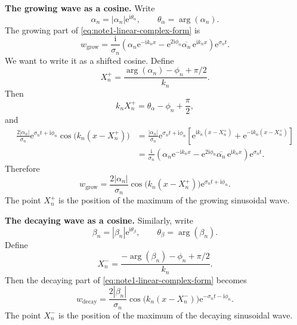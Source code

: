 \documentclass{amsart}
\newcounter{note}
\numberwithin{equation}{hw}
\newcommand{\noteheading}[1]{\vspace{1em}\noindent\textbf{#1}}
\begin{document}
\noteheading{The growing wave as a cosine.}
Write
\begin{equation}
\alpha_n=|\alpha_n|\mathrm{e}^{\mathrm{i}\theta_\alpha},
\qquad
\theta_\alpha=\arg(\alpha_n).
\label{eq:note1-alpha-phase}
\end{equation}
The growing part of \eqref{eq:note1-linear-complex-form} is
\begin{equation}
w_{\mathrm{grow}}
=
\frac{\mathrm{i}}{\sigma_n}
\left(
\alpha_n\mathrm{e}^{-\mathrm{i}k_nx}
-
\mathrm{e}^{2\mathrm{i}\phi_n}
\overline{\alpha_n}\,
\mathrm{e}^{\mathrm{i}k_nx}
\right)
\mathrm{e}^{\sigma_nt}.
\label{eq:note1-growing-complex}
\end{equation}
We want to write it as a shifted cosine.  Define
\begin{equation}
X_n^+
=
\frac{\arg(\alpha_n)-\phi_n+\pi/2}{k_n}.
\label{eq:note1-X-plus}
\end{equation}
Then
\begin{equation}
k_nX_n^+
=
\theta_\alpha-\phi_n+\frac{\pi}{2},
\label{eq:note1-X-plus-phase}
\end{equation}
and
\begin{align}
\frac{2|\alpha_n|}{\sigma_n}
\mathrm{e}^{\sigma_nt+\mathrm{i}\phi_n}
\cos\bigl(k_n(x-X_n^+)\bigr)
&=
\frac{|\alpha_n|}{\sigma_n}
\mathrm{e}^{\sigma_nt+\mathrm{i}\phi_n}
\left[
\mathrm{e}^{\mathrm{i}k_n(x-X_n^+)}
+
\mathrm{e}^{-\mathrm{i}k_n(x-X_n^+)}
\right]
\nonumber\\
&=
\frac{\mathrm{i}}{\sigma_n}
\left(
\alpha_n\mathrm{e}^{-\mathrm{i}k_nx}
-
\mathrm{e}^{2\mathrm{i}\phi_n}
\overline{\alpha_n}\,
\mathrm{e}^{\mathrm{i}k_nx}
\right)
\mathrm{e}^{\sigma_nt}.
\label{eq:note1-growing-cosine-check}
\end{align}
Therefore
\begin{equation}
w_{\mathrm{grow}}
=
\frac{2|\alpha_n|}{\sigma_n}
\cos\bigl(k_n(x-X_n^+)\bigr)
\mathrm{e}^{\sigma_nt+\mathrm{i}\phi_n}.
\label{eq:note1-growing-cosine}
\end{equation}
The point \(X_n^+\) is the position of the maximum of the growing
sinusoidal wave.

\noteheading{The decaying wave as a cosine.}
Similarly, write
\begin{equation}
\beta_n=|\beta_n|\mathrm{e}^{\mathrm{i}\theta_\beta},
\qquad
\theta_\beta=\arg(\beta_n).
\label{eq:note1-beta-phase}
\end{equation}
Define
\begin{equation}
X_n^-
=
\frac{-\arg(\beta_n)-\phi_n+\pi/2}{k_n}.
\label{eq:note1-X-minus}
\end{equation}
Then the decaying part of \eqref{eq:note1-linear-complex-form} becomes
\begin{equation}
w_{\mathrm{decay}}
=
\frac{2|\beta_n|}{\sigma_n}
\cos\bigl(k_n(x-X_n^-)\bigr)
\mathrm{e}^{-\sigma_nt-\mathrm{i}\phi_n}.
\label{eq:note1-decaying-cosine}
\end{equation}
The point \(X_n^-\) is the position of the maximum of the decaying
sinusoidal wave.
\end{document}
